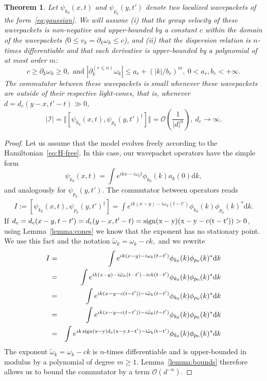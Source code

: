 \documentclass[notitlepage, prx, preprint, amsmath,superscriptaddress,amssymb]{revtex4-1}
\newtheorem{theorem}{Theorem}[section]
\begin{document}
\begin{theorem}
\label{th:free-causality}
Let $\psi_{k_0}(x,t)$ and $\psi_{p_0}(y,t')$ denote two localized wavepackets of the form\ \eqref{eq:gaussian}. We will assume (i) that the group velocity of these wavepackets is non-negative and upper-bounded by a constant $c$ within the domain of the wavepackets ($0 \leq v_k = \partial_k \omega_k \leq c$), and (ii) that the dispersion relation is $n$-times differentiable and that each derivative is upper-bounded by a polynomial of at most order $m$:
\begin{equation}
c \geq \partial_k\omega_k \geq 0, \mbox{ and } |\partial^{(r\leq n)}_k\omega_k|\leq a_r + (|k|/b_r)^m,~0< a_r,b_r<+\infty.
\end{equation}
The commutator between these wavepackets is small whenever these wavepackets are outside of their respective light-cones, that is, whenever $d=d_c(y-x,t'-t)\gg 0$, 
\begin{equation}
|\mathcal{I}|=\Vert[\psi_{k_0}(x,t),\psi_{p_0}(y,t')^\dagger]\Vert =
\mathcal{O}\left(\frac{1}{|d|^n}\right),~d_c\to\infty.
\end{equation}
\end{theorem}

\begin{proof}
Let us assume that the model evolves freely according to the Hamiltonian\ \eqref{eq:H-free}. In this case, our wavepacket operators have the simple form
\begin{equation}
\psi_{k_0}(x,t) = \int  e^{ikx-i\omega_kt} \phi_{k_0}(k) a_k(0) \mathrm{d}k,
\end{equation}
and analogously for $\psi_{p_0}(y,t')$. The commutator between operators reads
\begin{align}
I:=[\psi_{k_0}(x,t),\psi_{p_0}(y,t')^\dagger] =
\int e^{ik(x-y)-i\omega_k(t-t')} \phi_{k_0}(k)\phi_{p_0}(k)^*\mathrm{d}k.
\label{eq:free-com}
\end{align}
If $d_c= d_c(x-y,t-t')  = d_c(y-x,t'-t) = \rm{sign}(x-y)(x-y -c(t-t')) > 0$, using Lemma\ \ref{lemma:cones} we know that the exponent has no stationary point. We use this fact and the notation  $\tilde\omega_k = \omega_k -c k,$ and we rewrite
\begin{eqnarray*}
I&=& \int  e^{ik(x-y)-i\omega_k(t-t')}  \phi_{k_0}(k)\phi_{p_0}(k)^*\mathrm{d}k\\
&=& \int  e^{ik(x-y)-i\tilde\omega_k(t-t') - ick(t-t')}  \phi_{k_0}(k)\phi_{p_0}(k)^*\mathrm{d}k\\
&=& \int  e^{ik(x-y-c(t-t'))-i\tilde\omega_k(t-t')}  \phi_{k_0}(k)\phi_{p_0}(k)^*\mathrm{d}k\\
&=& \int  e^{ik(x-y-c(t-t'))-i\tilde\omega_k(t-t')}  \phi_{k_0}(k)\phi_{p_0}(k)^*\mathrm{d}k\\
&=&\int e^{ik\, \rm{sign}(x-y) d_c(x-y, t-t')-i\tilde\omega_k(t-t')} \phi_{k_0}(k)\phi_{p_0}(k)^*\mathrm{d}k
\end{eqnarray*}
The exponent $\tilde\omega_k = \omega_k -c k$ is $n$-times differentiable and is upper-bounded in modulus by a polynomial of degree $m\geq 1$. Lemma\ \ref{lemma:bounds} therefore allows us to bound the commutator by a term $\mathcal{O}(d^{-n})$.
\end{proof}
\end{document}
